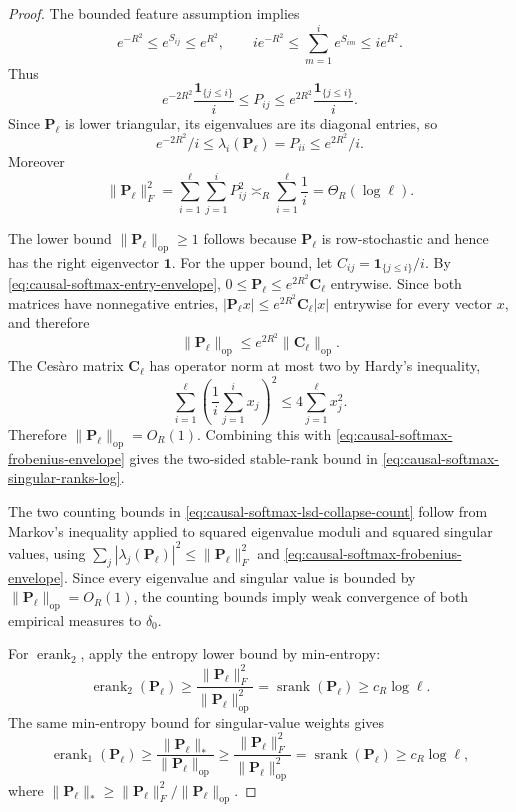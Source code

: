 \documentclass{article}
\newcommand{\srank}{\operatorname{srank}}
\newcommand{\erank}{\operatorname{erank}}
\newcommand{\op}{\operatorname{op}}
\newcommand{\one}{\mathbf{1}}
\newcommand{\bC}{\mathbf{C}}
\newcommand{\bP}{\mathbf{P}}
\theoremstyle{definition}
\theoremstyle{remark}
\begin{document}
\begin{proof}
The bounded feature assumption implies
\[
    e^{-R^2}\leq e^{S_{ij}}\leq e^{R^2},
    \qquad
    i e^{-R^2}
    \leq
    \sum_{m=1}^{i}e^{S_{im}}
    \leq
    i e^{R^2}.
\]
Thus
\begin{equation}
    e^{-2R^2}\frac{\one_{\{j\leq i\}}}{i}
    \leq
    P_{ij}
    \leq
    e^{2R^2}\frac{\one_{\{j\leq i\}}}{i}.
    \label{eq:causal-softmax-entry-envelope}
\end{equation}
Since $\bP_\ell$ is lower triangular, its eigenvalues are its diagonal entries,
so
\begin{equation}
    e^{-2R^2}/i
    \leq
    \lambda_i(\bP_\ell)=P_{ii}
    \leq
    e^{2R^2}/i.
    \label{eq:causal-softmax-diagonal-envelope}
\end{equation}
Moreover
\begin{equation}
    \|\bP_\ell\|_F^2
    =
    \sum_{i=1}^{\ell}\sum_{j=1}^{i}P_{ij}^2
    \asymp_R
    \sum_{i=1}^{\ell}\frac{1}{i}
    =
    \Theta_R(\log\ell).
    \label{eq:causal-softmax-frobenius-envelope}
\end{equation}

The lower bound $\|\bP_\ell\|_{\op}\geq1$ follows because $\bP_\ell$ is
row-stochastic and hence has the right eigenvector $\mathbf 1$.  For the upper
bound, let $C_{ij}=\one_{\{j\leq i\}}/i$.  By
\eqref{eq:causal-softmax-entry-envelope}, $0\leq\bP_\ell\leq e^{2R^2}\bC_\ell$
entrywise.  Since both matrices have nonnegative entries,
$|\bP_\ell x|\leq e^{2R^2}\bC_\ell|x|$ entrywise for every vector $x$, and
therefore
\[
    \|\bP_\ell\|_{\op}
    \leq
    e^{2R^2}\|\bC_\ell\|_{\op}.
\]
The Ces\`aro matrix $\bC_\ell$ has operator norm at most two by Hardy's
inequality,
\[
    \sum_{i=1}^{\ell}
    \left(\frac1i\sum_{j=1}^{i}x_j\right)^2
    \leq
    4\sum_{j=1}^{\ell}x_j^2.
\]
Therefore $\|\bP_\ell\|_{\op}=O_R(1)$.  Combining this with
\eqref{eq:causal-softmax-frobenius-envelope} gives the two-sided stable-rank
bound in \eqref{eq:causal-softmax-singular-ranks-log}.

The two counting bounds in \eqref{eq:causal-softmax-lsd-collapse-count} follow
from Markov's inequality applied to squared eigenvalue moduli and squared
singular values, using
$\sum_j|\lambda_j(\bP_\ell)|^2\leq\|\bP_\ell\|_F^2$ and
\eqref{eq:causal-softmax-frobenius-envelope}.  Since every eigenvalue and
singular value is bounded by $\|\bP_\ell\|_{\op}=O_R(1)$, the counting bounds
imply weak convergence of both empirical measures to $\delta_0$.

For $\erank_2$, apply the entropy lower bound by min-entropy:
\[
    \erank_2(\bP_\ell)
    \geq
    \frac{\|\bP_\ell\|_F^2}{\|\bP_\ell\|_{\op}^2}
    =
    \srank(\bP_\ell)
    \geq
    c_R\log\ell.
\]
The same min-entropy bound for singular-value weights gives
\[
    \erank_1(\bP_\ell)
    \geq
    \frac{\|\bP_\ell\|_*}{\|\bP_\ell\|_{\op}}
    \geq
    \frac{\|\bP_\ell\|_F^2}{\|\bP_\ell\|_{\op}^2}
    =
    \srank(\bP_\ell)
    \geq
    c_R\log\ell,
\]
where $\|\bP_\ell\|_*\geq\|\bP_\ell\|_F^2/\|\bP_\ell\|_{\op}$.


\end{proof}
\end{document}
